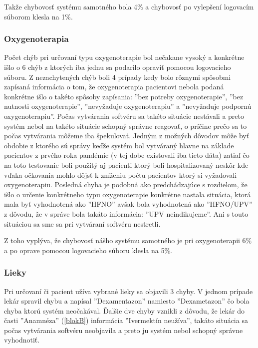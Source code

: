 Takže chybovosť systému samotného bola 4\% a chybovosť po vylepšení logovacím súborom klesla na 1\%.   

\subsubsection{Oxygenoterapia}

Počet chýb pri určovaní typu oxygenoterapie bol nečakane vysoký a konkrétne išlo o 6 chýb z ktorých iba jednu sa podarilo opraviť pomocou logovacieho súboru. Z nezachytených chýb boli 4 prípady kedy bolo rôznymi spôsobmi zapísaná informácia o tom, že oxygenoterapia pacientovi nebola podaná konkrétne išlo o takéto spôsoby zapísania: ''bez potreby oxygenoterapie'', ''bez nutnosti oxygenoterapie'', ''nevyžaduje oxygenoterapiu'' a ''nevyžaduje podpornú oxygenoterapiu''. Počas vytvárania softvéru sa takéto situácie nestávali a preto systém nebol na takéto situácie schopný správne reagovať, o príčine prečo sa to počas vytvárania môžeme iba špekulovať. Jedným z možných dôvodov môže byť obdobie z ktorého sú správy keďže systém bol vytváraný hlavne na základe pacientov z prvého roka pandémie (v tej dobe existovali iba tieto dáta) zatiaľ čo na toto testovanie boli použitý aj pacienti ktorý boli hospitalizovaný neskôr kde vďaka očkovania mohlo dôjsť k zníženiu počtu pacientov ktorý si vyžadovali oxygenoterapiu. Posledná chyba je podobná ako predchádzajúce s rozdielom, že išlo o určenie konkrétneho typu oxygenoterapie konkrétne nastala situácia, ktorá mala byť vyhodnotená ako ''HFNO'' avšak bola vyhodnotená ako ''HFNO/UPV'' z dôvodu, že v správe bola takáto informácia: ''UPV neindikujeme''. Ani s touto situáciou sa sme sa pri vytváraní softvéru nestretli.  

Z toho vyplýva, že chybovosť nášho systému samotného je pri oxygenoterapii 6\% a po oprave pomocou logovacieho súboru klesla na 5\%. 

\subsubsection{Lieky}

Pri určovaní či pacient užíva vybrané lieky sa objavili 3 chyby. V jednom prípade lekár spravil chybu a napísal ''Dexamentazon'' namiesto ''Dexametazon'' čo bola chyba ktorú systém neočakával. Ďalšie dve chyby vznikli z dôvodu, že lekár do časti ''Anamnéza'' (\ref{blokB}) informácia ''Ivermektín neužíva'', takáto situácia sa počas vytvárania softvéru neobjavila a preto ju systém nebol schopný správne vyhodnotiť.


